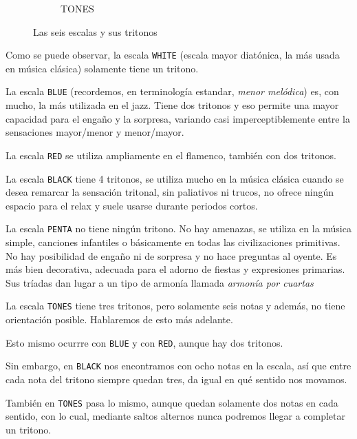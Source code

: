 \documentclass[]{report}
\begin{document}
\begin{figure}[h]
\begin{subfigure}{0.15\textwidth}
    \caption{\textsf{TONES}}
    
  \end{subfigure}
  \hfill
  \caption{Las seis escalas y sus tritonos}\label{fig:the-six-scales-and-tritones}
\end{figure}


Como se puede observar, la escala \texttt{WHITE} (escala mayor diatónica, la más usada en música clásica) solamente tiene un tritono.

La escala \texttt{BLUE} (recordemos, en terminología estandar, \emph{menor melódica}) es, con mucho, la más utilizada en el jazz. Tiene dos tritonos y eso permite una mayor capacidad para el engaño y la sorpresa, variando casi imperceptiblemente entre la sensaciones mayor/menor y menor/mayor.

La escala \texttt{RED} se utiliza ampliamente en el flamenco, también con dos tritonos.

La escala \texttt{BLACK} tiene 4 tritonos, se utiliza mucho en la música clásica cuando se desea remarcar la sensación tritonal, sin paliativos ni trucos, no ofrece ningún espacio para el relax y suele usarse durante periodos cortos.

La escala \texttt{PENTA} no tiene ningún tritono. No hay amenazas, se utiliza en la música simple, canciones infantiles o básicamente en todas las civilizaciones primitivas. No hay posibilidad de engaño ni de sorpresa y no hace preguntas al oyente. Es más bien decorativa, adecuada para el adorno de fiestas y expresiones primarias. Sus tríadas dan lugar a un tipo de armonía llamada \emph{armonía por cuartas }

La escala \texttt{TONES} tiene tres tritonos, pero solamente seis notas y además, no tiene orientación posible. Hablaremos de esto más adelante.

Esto mismo ocurrre con \texttt{BLUE} y con \texttt{RED}, aunque hay dos tritonos.

Sin embargo, en \texttt{BLACK} nos encontramos con ocho notas en la escala, así que entre cada nota del tritono siempre quedan tres, da igual en qué sentido nos movamos.

También en \texttt{TONES} pasa lo mismo, aunque quedan solamente dos notas en cada sentido, con lo cual, mediante saltos alternos nunca podremos llegar a completar un tritono.
\end{document}
